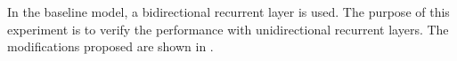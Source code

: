 
In the baseline model, a bidirectional recurrent layer is
used. The purpose of this experiment is to verify the
performance with unidirectional recurrent layers. The
modifications proposed are shown in .


